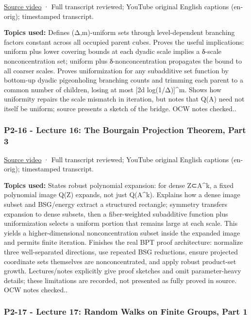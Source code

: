 \href{https://www.youtube.com/watch?v=1lql9PGvLG4}{Source video} · Full transcript reviewed; YouTube original English captions (en-orig); timestamped transcript.

\textbf{Topics used:} Defines (Δ,m)-uniform sets through level-dependent branching factors constant across all occupied parent cubes. Proves the useful implications: uniform plus lower covering bounds at each dyadic scale implies a δ-scale nonconcentration set; uniform plus δ-nonconcentration propagates the bound to all coarser scales. Proves uniformization for any subadditive set function by bottom-up dyadic pigeonholing branching counts and trimming each parent to a common number of children, losing at most {[}2d log(1/Δ){]}\^{}m. Shows how uniformity repairs the scale mismatch in iteration, but notes that Q(A) need not itself be uniform; source presents a sketch of the bridge. OCW notes checked..

\subsubsection{P2-16 - Lecture 16: The Bourgain Projection Theorem, Part 3}\label{04-visual-computing-ii-ch036-p2-16---lecture-16-the-bourgain-projection-theorem-part-3}

\href{https://www.youtube.com/watch?v=85YISwhp7MQ}{Source video} · Full transcript reviewed; YouTube original English captions (en-orig); timestamped transcript.

\textbf{Topics used:} States robust polynomial expansion: for dense Z⊂A\^{}k, a fixed polynomial image Q(Z) expands, not just Q(A\^{}k). Explains how a dense image subset and BSG/energy extract a structured rectangle; symmetry transfers expansion to dense subsets, then a fiber-weighted subadditive function plus uniformization selects a uniform portion that remains large at each scale. This yields a higher-dimensional nonconcentration subset inside the expanded image and permits finite iteration. Finishes the real BPT proof architecture: normalize three well-separated directions, use repeated BSG reductions, ensure projected coordinate sets themselves are nonconcentrated, and apply robust product-set growth. Lectures/notes explicitly give proof sketches and omit parameter-heavy details; these limitations are recorded, not presented as fully proved in source. OCW notes checked..

\subsubsection{P2-17 - Lecture 17: Random Walks on Finite Groups, Part 1}\label{04-visual-computing-ii-ch036-p2-17---lecture-17-random-walks-on-finite-groups-part-1}


